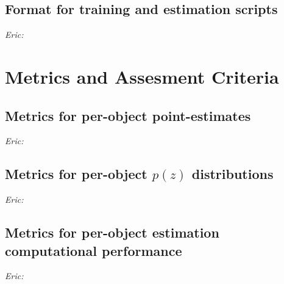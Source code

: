 \documentclass[modern]{desc-tex/styles/lsstdescnote}
\newcommand{\eac}[1]{{\em Eric:  }{\color{red}{#1}}}
\begin{document}
\subsection{Format for training and estimation scripts}

\eac{Details about data packaging}


\section{Metrics and Assesment Criteria}


\subsection{Metrics for per-object point-estimates}

\eac{Bias, scatter and MAD}


\subsection{Metrics for per-object $p(z)$ distributions}

\eac{PIT-QQ related metrics}


\subsection{Metrics for per-object estimation computational performance}

\eac{Training time, per-object estimation time, model size, estimate data volume per-object}









\end{document}
